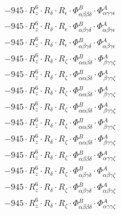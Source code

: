 \documentclass{article}
\begin{document}
\begin{subequations}
\begin{gather}
\begin{array}{c}
 \\[0.2em] 		 - 945 \cdot R_{z}^{6} \cdot R_{\delta{}} \cdot R_{\epsilon{}} \cdot \Phi{}^{B}_{\alpha{}\beta{}\beta{}\delta{}} \cdot \Phi{}^{A}_{\alpha{}\gamma{}\gamma{}\epsilon{}} 
 \\[0.2em] 		 - 945 \cdot R_{z}^{6} \cdot R_{\delta{}} \cdot R_{\epsilon{}} \cdot \Phi{}^{B}_{\alpha{}\beta{}\gamma{}\delta{}} \cdot \Phi{}^{A}_{\alpha{}\beta{}\gamma{}\epsilon{}} 
 \\[0.2em] 		 - 945 \cdot R_{z}^{6} \cdot R_{\delta{}} \cdot R_{\epsilon{}} \cdot \Phi{}^{B}_{\alpha{}\beta{}\gamma{}\delta{}} \cdot \Phi{}^{A}_{\alpha{}\beta{}\gamma{}\epsilon{}} 
 \\[0.2em] 		 - 945 \cdot R_{z}^{6} \cdot R_{\delta{}} \cdot R_{\zeta{}} \cdot \Phi{}^{B}_{\alpha{}\alpha{}\beta{}\delta{}} \cdot \Phi{}^{A}_{\beta{}\gamma{}\gamma{}\zeta{}} 
 \\[0.2em] 		 - 945 \cdot R_{z}^{6} \cdot R_{\delta{}} \cdot R_{\zeta{}} \cdot \Phi{}^{B}_{\alpha{}\alpha{}\beta{}\delta{}} \cdot \Phi{}^{A}_{\beta{}\gamma{}\gamma{}\zeta{}} 
 \\[0.2em] 		 - 945 \cdot R_{z}^{6} \cdot R_{\delta{}} \cdot R_{\zeta{}} \cdot \Phi{}^{B}_{\alpha{}\alpha{}\beta{}\delta{}} \cdot \Phi{}^{A}_{\beta{}\gamma{}\gamma{}\zeta{}} 
 \\[0.2em] 		 - 945 \cdot R_{z}^{6} \cdot R_{\delta{}} \cdot R_{\zeta{}} \cdot \Phi{}^{B}_{\alpha{}\alpha{}\beta{}\delta{}} \cdot \Phi{}^{A}_{\beta{}\gamma{}\gamma{}\zeta{}} 
 \\[0.2em] 		 - 945 \cdot R_{z}^{6} \cdot R_{\delta{}} \cdot R_{\zeta{}} \cdot \Phi{}^{B}_{\alpha{}\alpha{}\beta{}\delta{}} \cdot \Phi{}^{A}_{\beta{}\gamma{}\gamma{}\zeta{}} 
 \\[0.2em] 		 - 945 \cdot R_{z}^{6} \cdot R_{\delta{}} \cdot R_{\zeta{}} \cdot \Phi{}^{B}_{\alpha{}\alpha{}\beta{}\delta{}} \cdot \Phi{}^{A}_{\beta{}\gamma{}\gamma{}\zeta{}} 
 \\[0.2em] 		 - 945 \cdot R_{z}^{6} \cdot R_{\delta{}} \cdot R_{\zeta{}} \cdot \Phi{}^{B}_{\alpha{}\beta{}\beta{}\delta{}} \cdot \Phi{}^{A}_{\alpha{}\gamma{}\gamma{}\zeta{}} 
 \\[0.2em] 		 - 945 \cdot R_{z}^{6} \cdot R_{\delta{}} \cdot R_{\zeta{}} \cdot \Phi{}^{B}_{\alpha{}\beta{}\gamma{}\delta{}} \cdot \Phi{}^{A}_{\alpha{}\beta{}\gamma{}\zeta{}} 
 \\[0.2em] 		 - 945 \cdot R_{z}^{6} \cdot R_{\delta{}} \cdot R_{\zeta{}} \cdot \Phi{}^{B}_{\alpha{}\beta{}\gamma{}\delta{}} \cdot \Phi{}^{A}_{\alpha{}\beta{}\gamma{}\zeta{}} 
 \\[0.2em] 		 - 945 \cdot R_{z}^{6} \cdot R_{\delta{}} \cdot R_{\zeta{}} \cdot \Phi{}^{B}_{\alpha{}\beta{}\beta{}\delta{}} \cdot \Phi{}^{A}_{\alpha{}\gamma{}\gamma{}\zeta{}} 

\end{array}
\end{gather}
\end{subequations}
\end{document}
